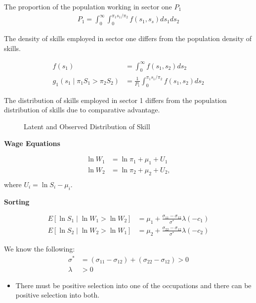  \begin{frame}
 The proportion of the population working in sector one $P_1$
 \begin{align*}
 P_1 = \int^\infty_0 \int^{\pi_1 s_1 / \pi_2}_0 f(s_1, s_s) ds_1ds_2
 \end{align*}

 The density of skills employed in sector one differs from the population density of skills.

 \begin{align*}
 f(s_1) & = \int^\infty_0 f(s_1, s_2) ds_2 \\
 g_1(s_1 \mid \pi_1 S_1 > \pi_2 S_2) & = \frac{1}{P_1} \int^{\pi_1 s_1 /\pi_2}_0 f(s_1, s_2) ds_2
 \end{align*}


 The distribution of skills employed in sector 1 differs from the population distribution of skills due to comparative advantage.
 \end{frame}



\begin{frame}
\begin{figure}[htp]\centering
\caption{Latent and Observed Distribution of Skill}\label{Latent and Observed Distribution of Skill}
\end{figure}
\end{frame}


\begin{frame}

\textbf{Wage Equations}

\begin{align*}
\ln W_1 & = \ln \pi_1 + \mu_1 + U_1 \\
\ln W_2 & = \ln \pi_2 + \mu_2 + U_2, \\
\end{align*}
where $U_i = \ln S_i - \mu_i$.

\end{frame}


\begin{frame}

\textbf{Sorting}

\begin{align*}
E[\ln S_1 \mid \ln W_1 > \ln W_2] & = \mu_1 + \frac{\sigma_{11} - \sigma_{12}}{\sigma^*} \lambda(-c_1) \\
E[\ln S_2 \mid \ln W_2 > \ln W_1] & = \mu_2 + \frac{\sigma_{22} - \sigma_{12}}{\sigma^*} \lambda(-c_2)
\end{align*}

We know the following:
\begin{align*}
\sigma^* & = (\sigma_{11} - \sigma_{12}) +  (\sigma_{22} - \sigma_{12}) > 0 \\
\lambda &> 0
\end{align*}

\begin{itemize}
\item There must be positive selection into one of the occupations and there can be positive selection into both.
\end{itemize}

\end{frame}


